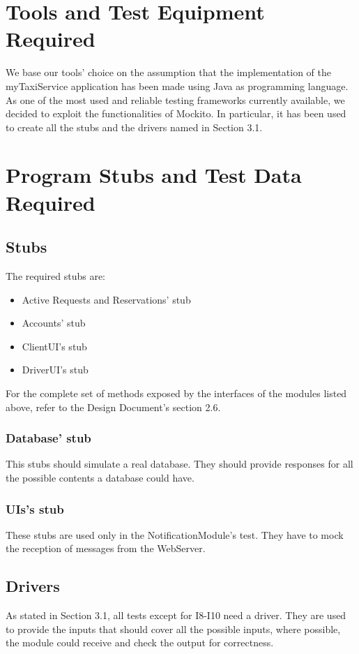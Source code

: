 \documentclass{article}
\begin{document}
\section{Tools and Test Equipment Required}
We base our tools' choice on the assumption that
the implementation of the myTaxiService application
has been made using Java as programming language.
As one of the most used and reliable testing frameworks
currently available, we decided to exploit the
functionalities of Mockito. In particular, it
has been used to create all the stubs and the drivers
named in Section 3.1.
\section{Program Stubs and Test Data Required}
\subsection{Stubs}
The required stubs are:
\begin{itemize}
	\item Active Requests and Reservations' stub
	\item Accounts' stub
	\item ClientUI's stub
	\item DriverUI's stub
\end{itemize}
For the complete set of methods exposed by the 
interfaces of the modules listed above, refer
to the Design Document's section 2.6.
\subsubsection{Database' stub}
This stubs should simulate a real database. They 
should provide responses for all the possible contents 
a database could have.
\subsubsection{UIs's stub}
These stubs are used only in the NotificationModule's test.
They have to mock the reception of messages from the WebServer.
\subsection{Drivers}
As stated in Section 3.1, all tests except for I8-I10 need 
a driver. They are used to provide the inputs that should cover
all the possible inputs, where possible, the module could receive
and check the output for correctness.
\end{document}
